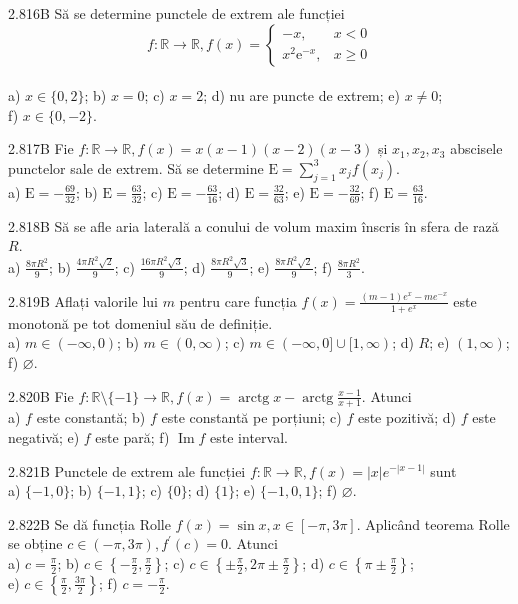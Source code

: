 \documentclass[11pt]{article}
\begin{document}
2.816B Să se determine punctele de extrem ale funcției $$f: \mathbb{R} \rightarrow \mathbb{R}, f(x)= \begin{cases}-x, & x<0 \\ x^{2} \mathrm{e}^{-x}, & x \geq 0\end{cases}$$\\ a) $x \in\{0,2\}$; b) $x=0$; c) $x=2$; d) nu are puncte de extrem; e) $x \neq 0$;\\ f) $x \in\{0,-2\}$.

2.817B Fie $f: \mathbb{R} \rightarrow \mathbb{R}, f(x)=x(x-1)(x-2)(x-3)$ și $x_{1}, x_{2}, x_{3}$ abscisele punctelor sale de extrem. Să se determine $\mathrm{E}=\sum_{j=1}^{3} x_{j} f\left(x_{j}\right)$.\\ a) $\mathrm{E}=-\frac{69}{32}$; b) $\mathrm{E}=\frac{63}{32}$; c) $\mathrm{E}=-\frac{63}{16}$; d) $\mathrm{E}=\frac{32}{63}$; e) $\mathrm{E}=-\frac{32}{69}$; f) $\mathrm{E}=\frac{63}{16}$.

2.818B Să se afle aria laterală a conului de volum maxim înscris în sfera de rază $R$.\\ a) $\frac{8 \pi R^{2}}{9}$; b) $\frac{4 \pi R^{2} \sqrt{2}}{9}$; c) $\frac{16 \pi R^{2} \sqrt{3}}{9}$; d) $\frac{8 \pi R^{2} \sqrt{3}}{9}$; e) $\frac{8 \pi R^{2} \sqrt{2}}{9}$; f) $\frac{8 \pi R^{2}}{3}$.

2.819B Aflați valorile lui $m$ pentru care funcția $f(x)=\frac{(m-1) e^{x}-m e^{-x}}{1+e^{x}}$ este monotonă pe tot domeniul său de definiție.\\ a) $m \in(-\infty, 0)$; b) $m \in(0, \infty)$; c) $m \in(-\infty, 0] \cup[1, \infty)$; d) $R$; e) $(1, \infty)$;\\ f) $\varnothing$.

2.820B Fie $f: \mathbb{R} \setminus\{-1\} \rightarrow \mathbb{R}, f(x)=\operatorname{arctg} x-\operatorname{arctg} \frac{x-1}{x+1}$. Atunci\\ a) $f$ este constantă; b) $f$ este constantă pe porțiuni; c) $f$ este pozitivă; d) $f$ este negativă; e) $f$ este pară; f) $\operatorname{Im} f$ este interval.

2.821B Punctele de extrem ale funcției $f: \mathbb{R} \rightarrow \mathbb{R}, f(x)=|x| e^{-|x-1|}$ sunt\\ a) $\{-1,0\}$; b) $\{-1,1\}$; c) $\{0\}$; d) $\{1\}$; e) $\{-1,0,1\}$; f) $\varnothing$.

2.822B Se dă funcția Rolle $f(x)=\sin x, x \in[-\pi, 3 \pi]$. Aplicând teorema Rolle se obține $c \in(-\pi, 3 \pi), f^{\prime}(c)=0$. Atunci\\ a) $c=\frac{\pi}{2}$; b) $c \in\left\{-\frac{\pi}{2}, \frac{\pi}{2}\right\}$; c) $c \in\left\{ \pm \frac{\pi}{2}, 2 \pi \pm \frac{\pi}{2}\right\}$; d) $c \in\left\{\pi \pm \frac{\pi}{2}\right\}$;\\ e) $c \in\left\{\frac{\pi}{2}, \frac{3 \pi}{2}\right\}$; f) $c=-\frac{\pi}{2}$.
\end{document}
